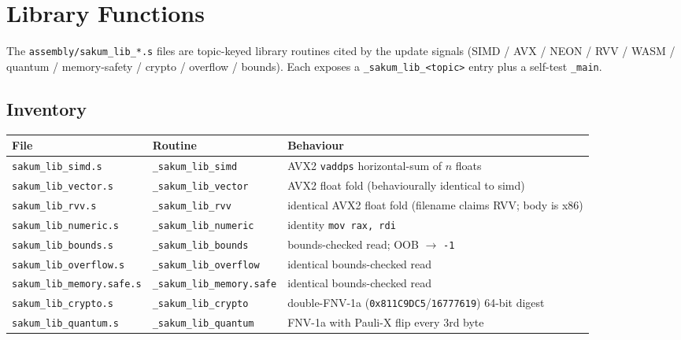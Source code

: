 \section{Library Functions}\label{ch:libs}

The \texttt{assembly/sakum\_lib\_*.s} files are topic-keyed library
routines cited by the update signals (SIMD / AVX / NEON / RVV / WASM /
quantum / memory-safety / crypto / overflow / bounds).  Each exposes a
\texttt{\_sakum\_lib\_<topic>} entry plus a self-test \texttt{\_main}.

\subsection{Inventory}

\begin{table}[H]
\centering
\begin{tabularx}{\textwidth}{lXl}
\toprule
File & Routine & Behaviour \\
\midrule
\texttt{sakum\_lib\_simd.s} & \texttt{\_sakum\_lib\_simd} & AVX2 \texttt{vaddps}
  horizontal-sum of $n$ floats \\
\texttt{sakum\_lib\_vector.s} & \texttt{\_sakum\_lib\_vector} & AVX2 float fold
  (behaviourally identical to simd) \\
\texttt{sakum\_lib\_rvv.s} & \texttt{\_sakum\_lib\_rvv} & identical AVX2 float
  fold (filename claims RVV; body is x86) \\
\texttt{sakum\_lib\_numeric.s} & \texttt{\_sakum\_lib\_numeric} & identity
  \texttt{mov rax, rdi} \\
\texttt{sakum\_lib\_bounds.s} & \texttt{\_sakum\_lib\_bounds} & bounds-checked
  read; OOB $\to$ \texttt{-1} \\
\texttt{sakum\_lib\_overflow.s} & \texttt{\_sakum\_lib\_overflow} & identical
  bounds-checked read \\
\texttt{sakum\_lib\_memory.safe.s} & \texttt{\_sakum\_lib\_memory.safe} &
  identical bounds-checked read \\
\texttt{sakum\_lib\_crypto.s} & \texttt{\_sakum\_lib\_crypto} & double-FNV-1a
  (\texttt{0x811C9DC5}/\texttt{16777619}) 64-bit digest \\
\texttt{sakum\_lib\_quantum.s} & \texttt{\_sakum\_lib\_quantum} & FNV-1a with
  Pauli-X flip every 3rd byte \\
\bottomrule
\end{tabularx}
\end{table}

